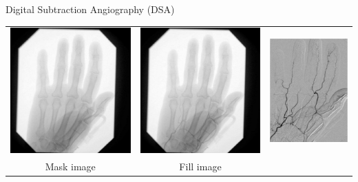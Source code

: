 \begin{frame}[c]{Digital Subtraction Angiography (DSA)}
	\begin{center}
		\begin{tabular}{ccc}
			\includegraphics[height=.3\linewidth]{images/dsa_mask.pdf} & \includegraphics[height=.3\linewidth]{images/dsa_fill.pdf} & \includegraphics[height=.3\linewidth]{images/dsa_diff.pdf} \\
			{\color{faublue}Mask image}                                                   & {\color{faublue}Fill image}                                                   & {\color{faublue}{Angiogram}}                                                  \\
		\end{tabular}

\end{center}
\end{frame}
